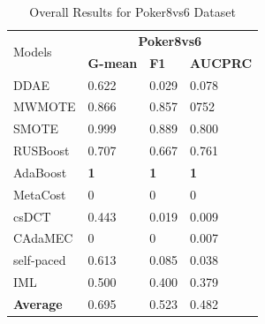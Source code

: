 \begin{table}[h]
    \centering
    \vspace{-13pt}
    \begin{tabular}{|p{}<{\centering}|p{}<{\centering}|p{}<{\centering}|p{}<{\centering}|}
    \hline
    \multirow{2}{*}{Models} & \multicolumn{3}{c|}{\textbf{Poker8vs6}}    \\ \cline{2-4} 
                             & \textbf{G-mean} & \textbf{F1} & \textbf{AUCPRC} \\ \hline
    DDAE                     &0.622	&0.029	&0.078              \\ \hline
    MWMOTE                   &0.866	&0.857	&0752            \\ \hline
    SMOTE                    &0.999	&0.889	&0.800               \\ \hline
    RUSBoost                 &0.707	&0.667	&0.761            \\ \hline
    AdaBoost                 & \textbf{1}	&\textbf{1}	&\textbf{1}             \\ \hline
    MetaCost                 & 0	&0	&0             \\ \hline
    csDCT                    &0.443	&0.019	&0.009              \\ \hline
    CAdaMEC                  &  0	&0	&0.007              \\ \hline
    self-paced               & 0.613	&0.085	&0.038              \\ \hline
    IML                      & 0.500	&0.400	&0.379             \\ \hline\hline
    \textbf{Average}         & 0.695	&0.523	&0.482               \\ \hline
    \end{tabular}
    \vspace{-8pt}
    \caption{Overall Results for Poker8vs6 Dataset}
    \label{tab17}
\end{table}
\vspace{-20pt}
